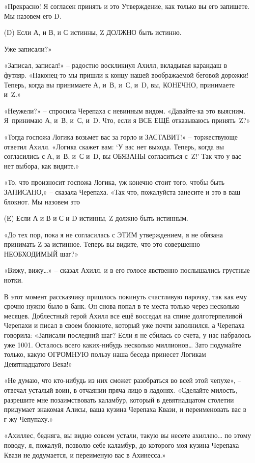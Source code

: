 \documentclass[../main.tex]{subfiles}
\begin{document}
«Прекрасно! Я согласен принять и это Утверждение, как только вы его запишете. Мы назовем его D.

\begin{statements}
    \item[(D)] Если А, и В, и С истинны, Z ДОЛЖНО быть истинно.
\end{statements}

Уже записали?»

«Записал, записал!» \--- радостно воскликнул Ахилл, вкладывая карандаш в футляр. «Наконец-то мы пришли к концу нашей воображаемой беговой дорожки! Теперь, когда вы принимаете А, и~В, и~С, и~D, вы, КОНЕЧНО, принимаете и~Z.»

«Неужели?» \--- спросила Черепаха с невинным видом. «Давайте-ка это выясним. Я~принимаю А, и~В, и~С, и~D. Что, если я ВСЕ ЕЩЁ отказываюсь принять~Z?»

«Тогда госпожа Логика возьмет вас за горло и ЗАСТАВИТ!» \--- торжествующе ответил Ахилл. «Логика скажет вам: \enquote*{У вас нет выхода. Теперь, когда вы согласились с А, и~В, и~С и~D, вы ОБЯЗАНЫ согласиться с~Z!} Так что у вас нет выбора, как видите.»

«То, что произносит госпожа Логика, уж конечно стоит того, чтобы быть ЗАПИСАНО,» \--- сказала Черепаха. «Так что, пожалуйста занесите и это в ваш блокнот. Мы назовем это

\begin{statements}
    \item[(E)] Если А и В и С и D истинны, Z должно быть истинным.
\end{statements}

«До тех пор, пока я не согласилась с ЭТИМ утверждением, я не обязана принимать Z за истинное. Теперь вы видите, что это совершенно НЕОБХОДИМЫЙ шаг?»

«Вижу, вижу\ldots» \--- сказал Ахилл, и в его голосе явственно послышались грустные нотки.

В этот момент рассказчику пришлось покинуть счастливую парочку, так как ему срочно нужно было в банк. Он снова попал в те места только через несколько месяцев. Доблестный герой Ахилл все ещё восседал на спине долготерпеливой Черепахи и писал в своем блокноте, который уже почти заполнился, а Черепаха говорила: «Записали последний шаг? Если я не сбилась со счета, у нас набралось уже 1001. Осталось всего каких-нибудь несколько миллионов\ldots{} Зато подумайте только, какую ОГРОМНУЮ пользу наша беседа принесет Логикам Девятнадцатого Века!»

«Не думаю, что кто-нибудь из них сможет разобраться во всей этой чепухе», \--- отвечал усталый воин, в отчаянии пряча лицо в ладонях. «Сделайте милость, разрешите мне позаимствовать каламбур, который в девятнадцатом столетии придумает знакомая Алисы, ваша кузина Черепаха Квази, и переименовать вас в г-жу Чепупаху.»

«Ахиллес, бедняга, вы видно совсем устали, такую вы несете ахиллею\ldots{} по этому поводу, я, пожалуй, позволю себе каламбур, до которого моя кузина Черепаха Квази не додумается, и переименую вас в Ахинесса.»
\end{document}
